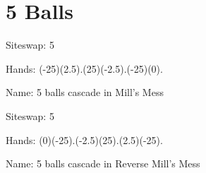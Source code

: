 \documentclass[preview]{standalone}
\begin{document}
\section{5 Balls}

\begin{plainhtml}
    Siteswap: 5
\end{plainhtml}
\begin{plainhtml}
    Hands: (-25)(2.5).(25)(-2.5).(-25)(0).
\end{plainhtml}
\begin{plainhtml}
    Name: 5 balls cascade in Mill's Mess
\end{plainhtml}

\begin{plainhtml}
    Siteswap: 5
\end{plainhtml}
\begin{plainhtml}
    Hands: (0)(-25).(-2.5)(25).(2.5)(-25).
\end{plainhtml}
\begin{plainhtml}
    Name: 5 balls cascade in Reverse Mill's Mess
\end{plainhtml}
\end{document}
